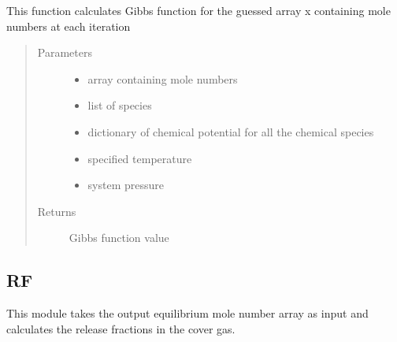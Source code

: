 \documentclass[letterpaper,10pt,english]{sphinxmanual}
\begin{document}
\begin{fulllineitems}
This function calculates Gibbs function for the guessed array x containing mole numbers at each iteration
\begin{quote}\begin{description}
\item[{Parameters}] \leavevmode\begin{itemize}
\item {} 
 \textendash{} array containing mole numbers

\item {} 
 \textendash{} list of species

\item {} 
 \textendash{} dictionary of chemical potential for all the chemical species

\item {} 
 \textendash{} specified temperature

\item {} 
 \textendash{} system pressure

\end{itemize}

\item[{Returns}] \leavevmode
Gibbs function value

\end{description}\end{quote}

\end{fulllineitems}



\subsection{RF}
\label{\detokenize{code_structure:rf}}

This module takes the output equilibrium mole number array as input and calculates the release fractions in the cover gas.
\end{document}
